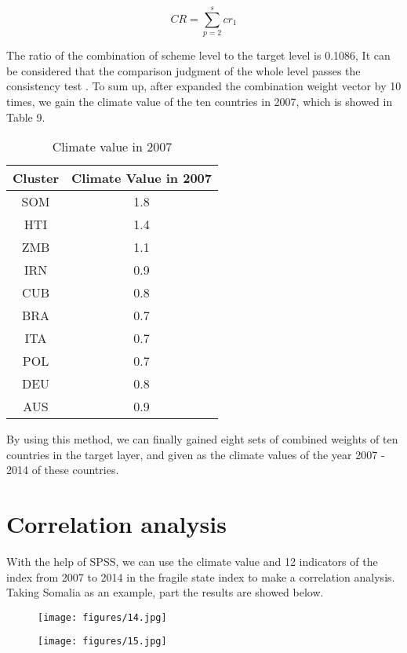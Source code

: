 \documentclass{mcmthesis}
\begin{document}
\[CR = \sum\limits_{p = 2}^s {c{r_1}} \]

The ratio of the combination of scheme level to the target level is 0.1086,  It can be considered that the comparison judgment of the whole level passes the consistency test .
To sum up, after expanded the combination weight vector by 10 times, we gain the climate value of the ten countries in 2007, which is showed in Table 9.

\begin{table}[htbp]
\centering
\caption{Climate value in 2007}
\begin{tabular}{c|c}   %
\hline
  Cluster & Climate Value in 2007 \\
\hline
SOM &1.8 \\
HTI & 1.4\\
ZMB &1.1 \\ 
IRN &0.9\\
CUB & 0.8\\ 
BRA &0.7\\
ITA &0.7\\ 
POL &0.7\\ 
DEU &0.8\\
AUS& 0.9\\
\hline
\end{tabular}
\end{table}

By using this method, we can finally gained eight sets of combined weights of ten countries in the target layer, and given as the climate values of the year 2007 - 2014 of these countries.

\section{Correlation analysis}
With the help of SPSS, we can use the climate value and 12 indicators of the index from 2007 to 2014 in the fragile state index to make a correlation analysis. Taking Somalia as an example, part the results are showed below.


\begin{figure}[htbp]
\centering
\begin{minipage}{5cm}
\centering
\texttt{[image: figures/14.jpg]}
\label{figure5}
\end{minipage}
\begin{minipage}{5cm}
\centering
\texttt{[image: figures/15.jpg]}
\label{figure6}
\end{minipage}
\end{figure}
\end{document}
